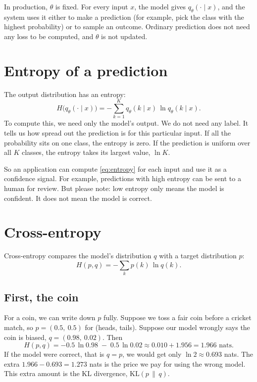 \documentclass[12pt]{article}
\begin{document}
In production, $\theta$ is fixed. For every input $x$, the model gives
$q_\theta(\cdot \mid x)$, and the system uses it either to make a
prediction (for example, pick the class with the highest probability)
or to sample an outcome. Ordinary prediction does not need any loss to
be computed, and $\theta$ is not updated.

\section*{Entropy of a prediction}

The output distribution has an entropy:
\begin{equation}
  H\big(q_\theta(\cdot \mid x)\big)
  = -\sum_{k=1}^{K} q_\theta(k \mid x)\,\ln q_\theta(k \mid x).
  \label{eq:entropy}
\end{equation}
To compute this, we need only the model's output. We do not need any
label. It tells us how spread out the prediction is for this particular
input. If all the probability sits on one class, the entropy is zero.
If the prediction is uniform over all $K$ classes, the entropy takes its
largest value, $\ln K$.

So an application can compute \eqref{eq:entropy} for each input and use
it as a confidence signal. For example, predictions with high entropy
can be sent to a human for review. But please note: low entropy only
means the model is confident. It does not mean the model is correct.

\section*{Cross-entropy}

Cross-entropy compares the model's distribution $q$ with a target
distribution $p$:
\begin{equation}
  H(p, q) = -\sum_{k} p(k)\,\ln q(k).
  \label{eq:crossentropy}
\end{equation}

\subsection*{First, the coin}

For a coin, we can write down $p$ fully. Suppose we toss a fair coin
before a cricket match, so $p = (0.5,\ 0.5)$ for (heads, tails). Suppose
our model wrongly says the coin is biased, $q = (0.98,\ 0.02)$. Then
\begin{equation}
  H(p, q) = -0.5\,\ln 0.98 \;-\; 0.5\,\ln 0.02
  \approx 0.010 + 1.956 = 1.966 \text{ nats}.
  \label{eq:coin}
\end{equation}
If the model were correct, that is $q = p$, we would get only
$\ln 2 \approx 0.693$ nats. The extra $1.966 - 0.693 = 1.273$ nats is
the price we pay for using the wrong model. This extra amount is the
KL divergence, $\mathrm{KL}(p \,\|\, q)$.
\end{document}
